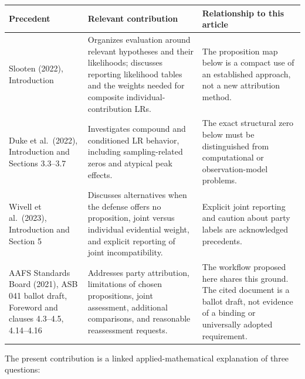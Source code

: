\documentclass[
]{article}
\newcounter{none} %
\begin{document}
{\def\LTcaptype{none} %
\begin{longtable}[]{@{}
  >{\raggedright\arraybackslash}p{}
  >{\raggedright\arraybackslash}p{}
  >{\raggedright\arraybackslash}p{}@{}}
\toprule\noalign{}
\begin{minipage}[b]{\linewidth}\raggedright
Precedent
\end{minipage} & \begin{minipage}[b]{\linewidth}\raggedright
Relevant contribution
\end{minipage} & \begin{minipage}[b]{\linewidth}\raggedright
Relationship to this article
\end{minipage} \\
\midrule\noalign{}
\endhead
\bottomrule\noalign{}
\endlastfoot
Slooten (2022), Introduction & Organizes evaluation around relevant
hypotheses and their likelihoods; discusses reporting likelihood tables
and the weights needed for composite individual-contribution LRs. & The
proposition map below is a compact use of an established approach, not a
new attribution method. \\
Duke et al.~(2022), Introduction and Sections 3.3--3.7 & Investigates
compound and conditioned LR behavior, including sampling-related zeros
and atypical peak effects. & The exact structural zero below must be
distinguished from computational or observation-model problems. \\
Wivell et al.~(2023), Introduction and Section 5 & Discusses
alternatives when the defense offers no proposition, joint versus
individual evidential weight, and explicit reporting of joint
incompatibility. & Explicit joint reporting and caution about party
labels are acknowledged precedents. \\
AAFS Standards Board (2021), ASB 041 ballot draft, Foreword and clauses
4.3--4.5, 4.14--4.16 & Addresses party attribution, limitations of
chosen propositions, joint assessment, additional comparisons, and
reasonable reassessment requests. & The workflow proposed here shares
this ground. The cited document is a ballot draft, not evidence of a
binding or universally adopted requirement. \\
\end{longtable}
}

The present contribution is a linked applied-mathematical explanation of
three questions:
\end{document}
